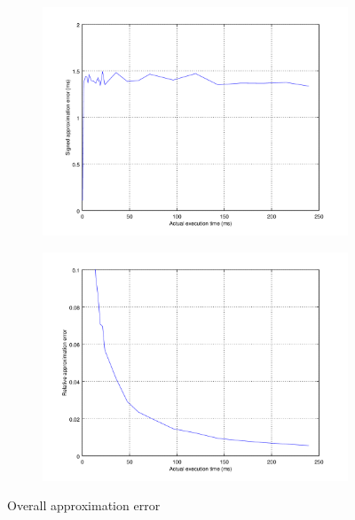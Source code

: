 \begin{figure}[ht!]
	\center
	\begin{subfigure}{0.45\linewidth}
		\center
		\includegraphics[width=1\linewidth]{fig/esterr.png}
	\end{subfigure}
	\begin{subfigure}{0.45\linewidth}
		\center
		\includegraphics[width=\linewidth]{fig/rtvesterr.png}
	\end{subfigure}
	\caption{Overall approximation error}
	\label{Fig: Overall approximation error}
\end{figure}

